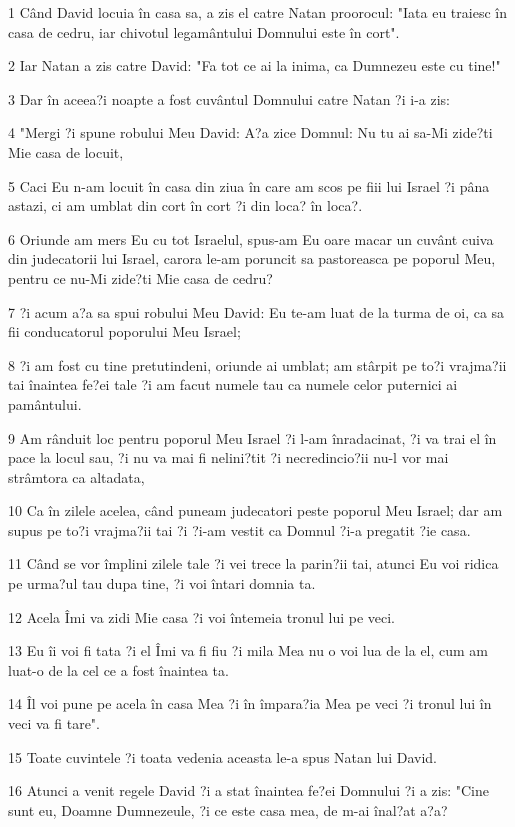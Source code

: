 \par 1 Când David locuia în casa sa, a zis el catre Natan proorocul: "Iata eu traiesc în casa de cedru, iar chivotul legamântului Domnului este în cort".
\par 2 Iar Natan a zis catre David: "Fa tot ce ai la inima, ca Dumnezeu este cu tine!"
\par 3 Dar în aceea?i noapte a fost cuvântul Domnului catre Natan ?i i-a zis:
\par 4 "Mergi ?i spune robului Meu David: A?a zice Domnul: Nu tu ai sa-Mi zide?ti Mie casa de locuit,
\par 5 Caci Eu n-am locuit în casa din ziua în care am scos pe fiii lui Israel ?i pâna astazi, ci am umblat din cort în cort ?i din loca? în loca?.
\par 6 Oriunde am mers Eu cu tot Israelul, spus-am Eu oare macar un cuvânt cuiva din judecatorii lui Israel, carora le-am poruncit sa pastoreasca pe poporul Meu, pentru ce nu-Mi zide?ti Mie casa de cedru?
\par 7 ?i acum a?a sa spui robului Meu David: Eu te-am luat de la turma de oi, ca sa fii conducatorul poporului Meu Israel;
\par 8 ?i am fost cu tine pretutindeni, oriunde ai umblat; am stârpit pe to?i vrajma?ii tai înaintea fe?ei tale ?i am facut numele tau ca numele celor puternici ai pamântului.
\par 9 Am rânduit loc pentru poporul Meu Israel ?i l-am înradacinat, ?i va trai el în pace la locul sau, ?i nu va mai fi nelini?tit ?i necredincio?ii nu-l vor mai strâmtora ca altadata,
\par 10 Ca în zilele acelea, când puneam judecatori peste poporul Meu Israel; dar am supus pe to?i vrajma?ii tai ?i ?i-am vestit ca Domnul ?i-a pregatit ?ie casa.
\par 11 Când se vor împlini zilele tale ?i vei trece la parin?ii tai, atunci Eu voi ridica pe urma?ul tau dupa tine, ?i voi întari domnia ta.
\par 12 Acela Îmi va zidi Mie casa ?i voi întemeia tronul lui pe veci.
\par 13 Eu îi voi fi tata ?i el Îmi va fi fiu ?i mila Mea nu o voi lua de la el, cum am luat-o de la cel ce a fost înaintea ta.
\par 14 Îl voi pune pe acela în casa Mea ?i în împara?ia Mea pe veci ?i tronul lui în veci va fi tare".
\par 15 Toate cuvintele ?i toata vedenia aceasta le-a spus Natan lui David.
\par 16 Atunci a venit regele David ?i a stat înaintea fe?ei Domnului ?i a zis: "Cine sunt eu, Doamne Dumnezeule, ?i ce este casa mea, de m-ai înal?at a?a?
